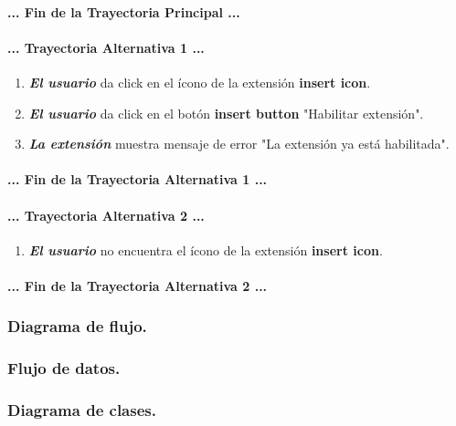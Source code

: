 \documentclass[12pt, a4paper, titlepage]{article}
\begin{document}
				\paragraph{... Fin de la Trayectoria Principal ...}
				
				\paragraph{... Trayectoria Alternativa 1 ...}
				\begin{enumerate}
					\item \textbf{\textit{El usuario}} da click en el ícono de la extensión \textbf{insert icon}.
					\item \textbf{\textit{El usuario}} da click en el botón \textbf{insert button} "Habilitar extensión".
					\item \textbf{\textit{La extensión}} muestra mensaje de error "La extensión ya está habilitada".
				\end{enumerate}
				\paragraph{... Fin de la Trayectoria Alternativa 1 ...}
				
				\paragraph{... Trayectoria Alternativa 2 ...}
				\begin{enumerate}
					\item \textbf{\textit{El usuario}} no encuentra el ícono de la extensión \textbf{insert icon}.
				\end{enumerate}
				\paragraph{... Fin de la Trayectoria Alternativa 2 ...}
			
				\newpage
				
			\subsubsection{Diagrama de flujo.}
			\subsubsection{Flujo de datos.}
			\subsubsection{Diagrama de clases.}
\end{document}
